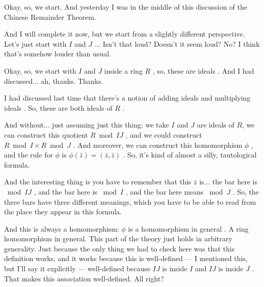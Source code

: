 \begin{speech}[00:00:00 - 00:02:30]
Okay, so, we start. And yesterday I was in the middle of this discussion of the Chinese Remainder Theorem. 

And I will complete it now, but we start from a slightly different perspective. Let's just start with $I$ and $J$ ... Isn't that loud? Doesn't it seem loud? No? I think that's somehow louder than usual.

Okay, so, we start with $I$ and $J$ inside a ring $R$ , so, these are ideals . And I had discussed... ah, thanks.  Thanks.

I had discussed last time that there's a notion of adding ideals  and multiplying ideals . So, these are both ideals of $R$ .

And without... just assuming just this thing: we take $I$ and $J$ are ideals of $R$, we can construct this quotient $R \bmod IJ$ , and we could construct $R \bmod I \times R \bmod J$ . And moreover, we can construct this homomorphism $\phi$ , and the rule for $\phi$ is $\phi(\bar{z}) = (\bar{z}, \bar{z})$ . So, it's kind of almost a silly, tautological formula.

And the interesting thing is you have to remember that this $\bar{z}$ is... the bar here is $\bmod IJ$ , and the bar here is $\bmod I$ , and the bar here means $\bmod J$ . So, the three bars have three different meanings, which you have to be able to read from the place they appear in this formula.

And this is always a homomorphism: $\phi$ is a homomorphism in general . A ring homomorphism in general. This part of the theory just holds in arbitrary generality. Just because the only thing we had to check here was that this definition works, and it works because this is well-defined  --- I mentioned this, but I'll say it explicitly --- well-defined because $IJ$ is inside $I$  and $IJ$ is inside $J$ . That makes this association well-defined. All right?
\end{speech}

